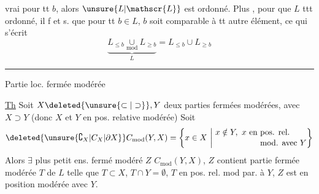 vrai pour tt $b$, alors $\unsure{L|\mathscr{L}}$ est  ordonné. Plus , pour que $L$ ttt ordonné, il f et s. que pour tt $b\in L$, $b$ soit comparable à tt autre élément, ce qui s'écrit
\[
\underbrace{L_{\leq b}\underset{\mathrm{mod}}{\cup}L_{\geq b}}_{L}=L_{\leq b}\cup L_{\geq b}
\]
\begin{center}\rule{2.5cm}{0.35pt}\end{center}

Partie loc. fermée modérée

\uline{Th} Soit $X\deleted{\unsure{\subset|\supset}},Y$ deux parties fermées modérées, avec $X\supset Y$ (donc $X$ et $Y$ en pos. relative modérée)
 
Soit
\[
\deleted{\unsure{\complement_X|C_X|\partial X}} C_{\mathrm{mod}}(Y,X)=\left\{x\in X\ \middle|\ 
\begin{aligned}&x\notin Y,\ x\text{ en pos. rel.}\\[-2pt]&\hphantom{x\notin Y,\ x\text{ en }}\text{mod. avec }Y\end{aligned}\right\}
\]
Alors $\exists$ plus petit ens. fermé modéré $Z$    $C_{\mathrm{mod}}(Y,X)$,  $Z$  contient  partie fermée modérée $T$ de $L$ telle que $T\subset X$, $T\cap Y=\emptyset$, $T$ en pos. rel. mod par.  à $Y$,  $Z$ est en position modérée avec $Y$.
